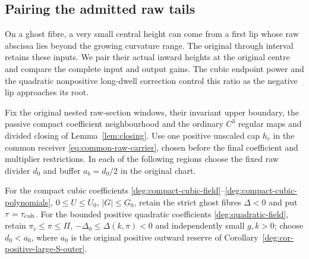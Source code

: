 \subsection{Pairing the admitted raw tails}
\label{subsec:paired-raw-tails}

On a ghost fibre, a very small central height can come from a first lip
whose raw abscissa lies beyond the growing curvature range. The original
through interval retains these inputs. We pair their actual inward
heights at the original centre and compare the complete input and output
gains. The cubic endpoint power and the quadratic
nonpositive long-dwell correction control this ratio as the negative lip
approaches its root.

\begin{proposition}
\label{rawpair:prop-original-tails}
Fix the original nested raw-section windows, their invariant upper
boundary, the passive compact coefficient neighbourhood and the ordinary
\(C^3\) regular maps and divided closing of Lemma~\ref{lem:closing}.
Use one positive unscaled cap \(h_c\) in the common receiver
\eqref{eq:common-raw-carrier}, chosen before the final coefficient and
multiplier restrictions. In each of the following regions choose the
fixed raw divider \(d_0\) and buffer \(a_b=d_0/2\) in the original
chart.

For the compact cubic coefficients
\eqref{deg:compact-cubic-field}--\eqref{deg:compact-cubic-polynomials},
\(0\le U\le U_0\), \(|G|\le G_0\), retain the strict ghost fibres
\(\Delta<0\) and put \(\tau=\tau_{\rm cub}\). For the bounded positive
quadratic coefficients \eqref{deg:quadratic-field}, retain
\(\pi_\flat\le\pi\le\Pi\), \(-\Delta_0\le\Delta(k,\pi)<0\)
and independently small \(g,k>0\); choose \(d_0<a_0\), where
\(a_0\) is the original positive outward reserve of
Corollary~\ref{deg:cor-positive-large-S-outer}.


\end{proposition}
